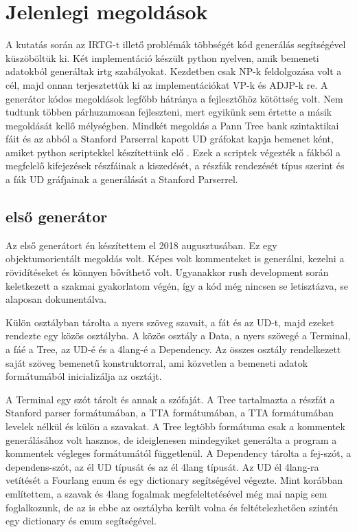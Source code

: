 \section{Jelenlegi megoldások}
A kutatás során az IRTG-t illető problémák többségét kód generálás segítségével küszöböltük ki. Két implementáció készült python nyelven, amik bemeneti adatokból generáltak irtg szabályokat. Kezdetben csak NP-k feldolgozása volt a cél, majd onnan terjesztettük ki az implementációkat VP-k és ADJP-k re. A generátor kódos megoldások legfőbb hátránya a fejlesztőhöz kötöttség volt. Nem tudtunk többen párhuzamosan fejleszteni, mert egyikünk sem értette a másik megoldását kellő mélységben.
Mindkét megoldás a Pann Tree bank szintaktikai fáit és az abból a Stanford Parserral kapott UD gráfokat kapja bemenet ként, amiket python scriptekkel készítettünk elő . Ezek a scriptek végezték a fákból a megfelelő kifejezések részfáinak a kiszedését, a részfák rendezését típus szerint és a fák UD gráfjainak a generálását a Stanford Parserrel.


\subsection{első generátor}
Az első generátort én készítettem el 2018 augusztusában. Ez egy objektumorientált megoldás volt. Képes volt kommenteket is generálni, kezelni a rövidítéseket és könnyen bővíthető volt. Ugyanakkor rush development során keletkezett a szakmai gyakorlatom végén, így a kód még nincsen se letisztázva, se alaposan dokumentálva.

Külön osztályban tárolta a nyers szöveg szavait, a fát és az UD-t, majd ezeket rendezte egy közös osztályba. A közös osztály a Data, a nyers szövegé a Terminal, a fáé a Tree, az UD-é és a 4lang-é a Dependency. Az összes osztály rendelkezett saját szöveg bemenetű konstruktorral, ami közvetlen a bemeneti adatok formátumából inicializálja az osztájt.

A Terminal egy szót tárolt és annak a szófaját. A Tree tartalmazta a részfát a Stanford parser formátumában, a TTA formátumában, a TTA formátumában levelek nélkül és külön a szavakat. A Tree legtöbb formátuma csak a kommentek generálásához volt hasznos, de ideiglenesen mindegyiket generálta a program a kommentek végleges formátumától függetlenül. A Dependency tárolta a fej-szót, a dependens-szót, az él UD típusát és az él 4lang típusát. Az UD él 4lang-ra vetítését a Fourlang enum és egy dictionary segítségével végezte. Mint korábban említettem, a szavak és 4lang fogalmak megfeleltetésével még mai napig sem foglalkozunk, de az is ebbe az osztályba került volna és feltételezhetően szintén egy dictionary és enum segítségével.

